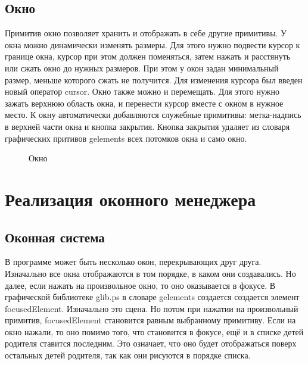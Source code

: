 \documentclass[14pt]{extarticle}
\begin{document}
	\subsection{Окно}
	Примитив окно позволяет хранить и отображать в себе другие примитивы. У окна можно динамически изменять размеры. Для этого нужно подвести курсор к границе окна, курсор при этом должен поменяться, затем нажать и расстянуть или сжать окно до нужных размеров. При этом у окон задан минимальный размер, меньше которого сжать не получится. Для изменения курсора был введен новый оператор cursor. Окно также можно и перемещать. Для этого нужно зажать верхнюю область окна, и перенести курсор вместе с окном в нужное место. К окну автоматически добавляются служебные примитивы: метка-надпись в верхней части окна и кнопка закрытия. Кнопка закрытия удаляет из словаря графических притивов gelements всех потомков окна и само окно.
		\begin{figure}[h]
		\caption{ Окно }
		\label{ris:image}
		\end{figure}	
	\pagebreak
	
	\section{Реализация оконного менеджера}
	\subsection{ Оконная система }
	В программе может быть несколько окон, перекрывающих друг друга. Изначально все окна отображаются в том порядке, в каком они создавались. Но далее, если нажать на произвольное окно, то оно оказывается в фокусе. В графической библиотеке glib.ps в словаре gelements создается создается элемент focusedElement. Изначально это сцена. Но потом при нажатии на произвольный примитив, focusedElement становится равным выбранному примитиву. Если на окно нажали, то оно помимо того, что становится в фокусе, ещё и в списке детей родителя ставится последним. Это означает, что оно будет отображаться поверх остальных детей родителя, так как они рисуются в порядке списка.
\end{document}
